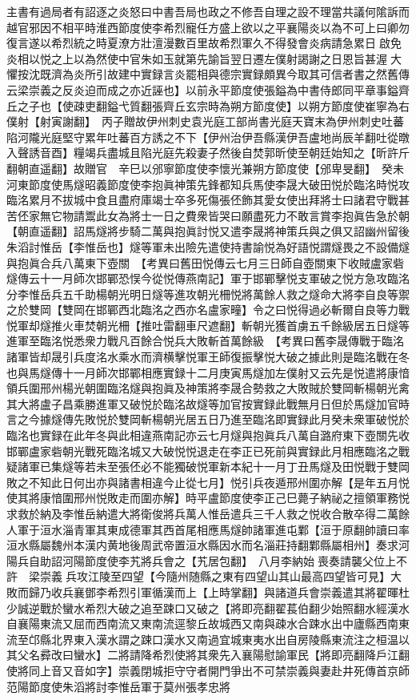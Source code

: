 主書有過局者有詔逐之炎怒曰中書吾局也政之不修吾自理之設不理當共議何隂訴而越官邪因不相平時淮西節度使李希烈寵任方盛上欲以之平襄陽炎以為不可上曰卿勿復言遂以希烈統之時夏潦方壯澶漫數百里故希烈軍久不得發會炎病請急累日啟免炎相以悦之上以為然使中官朱如玉就第先諭旨翌日遷左僕射謁謝之日恩旨甚渥大懼按沈既濟為炎所引故建中實録言炎罷相與德宗實録頗異今取其可信者書之然舊傳云梁崇義之反炎迫而成之亦近誣也】以前永平節度使張鎰為中書侍郎同平章事鎰齊丘之子也【使疎吏翻鎰弋質翻張齊丘玄宗時為朔方節度使】以朔方節度使崔寧為右僕射【射寅謝翻】　丙子贈故伊州刺史袁光庭工部尚書光庭天寶末為伊州刺史吐蕃陷河隴光庭堅守累年吐蕃百方誘之不下【伊州治伊吾縣漢伊吾盧地尚辰羊翻吐從暾入聲誘音酉】糧竭兵盡城且陷光庭先殺妻子然後自焚郭昕使至朝廷始知之【昕許斤翻朝直遥翻】故贈官　辛巳以邠寧節度使李懷光兼朔方節度使【邠卑旻翻】　癸未河東節度使馬燧昭義節度使李抱眞神策先鋒都知兵馬使李晟大破田悦於臨洺時悦攻臨洺累月不拔城中食且盡府庫竭士卒多死傷張伾飾其愛女使出拜將士曰諸君守戰甚苦伾家無它物請鬻此女為將士一日之費衆皆哭曰願盡死力不敢言賞李抱眞告急於朝【朝直遥翻】詔馬燧將步騎二萬與抱眞討悦又遣李晟將神策兵與之俱又詔幽州留後朱滔討惟岳【李惟岳也】燧等軍未出險先遣使持書諭悦為好語悦謂燧畏之不設備燧與抱眞合兵八萬東下壺關　【考異曰舊田悦傳云七月三日師自壺關東下收賊盧家砦燧傳云十一月師次邯鄲恐悮今從悦傳燕南記】軍于邯鄲擊悦支軍破之悦方急攻臨洺分李惟岳兵五千助楊朝光明日燧等進攻朝光柵悦將萬餘人救之燧命大將李自良等禦之於雙岡【雙岡在邯鄲西北臨洺之西亦名盧家疃】令之曰悦得過必斬爾自良等力戰悦軍却燧推火車焚朝光柵【推吐雷翻車尺遮翻】斬朝光獲首虜五千餘級居五日燧等進軍至臨洺悦悉衆力戰凡百餘合悦兵大敗斬首萬餘級　【考異曰舊李晟傳戰于臨洺諸軍皆却晟引兵度洺水乘水而濟横擊悦軍王師復振擊悦大破之據此則是臨洺戰在冬也與馬燧傳十一月師次邯鄲相應實録十二月庚寅馬燧加左僕射又云先是悦遣將康愔領兵圍邢州楊光朝圍臨洺燧與抱眞及神策將李晟合勢救之大敗賊於雙岡斬楊朝光禽其大將盧子昌乘勝進軍又破悦於臨洺故燧等加官按實録此戰無月日但於馬燧加官時言之今據燧傳先敗悦於雙岡斬楊朝光居五日乃進至臨洺即實録此月癸未衆軍破悦於臨洺也實録在此年冬與此相違燕南記亦云七月燧與抱眞兵八萬自潞府東下壺關先收邯鄲盧家砦朝光戰死臨洺城又大破悦悦退走在李正已死前與實録此月相應臨洺之戰疑諸軍已集燧等若未至張伾必不能獨破悦軍新本紀十一月丁丑馬燧及田悦戰于雙岡敗之不知此日何出亦與諸書相違今止從七月】悦引兵夜遁邢州圍亦解【是年五月悦使其將康愔圍邢州悦敗走而圍亦解】時平盧節度使李正己巳薨子納祕之擅領軍務悦求救於納及李惟岳納遣大將衛俊將兵萬人惟岳遣兵三千人救之悦收合散卒得二萬餘人軍于洹水淄青軍其東成德軍其西首尾相應馬燧帥諸軍進屯鄴【洹于原翻帥讀曰率洹水縣屬魏州本漢内黄地後周武帝置洹水縣因水而名淄莊持翻鄴縣屬相州】奏求河陽兵自助詔河陽節度使李艽將兵會之【艽居包翻】　八月李納始喪奏請襲父位上不許　梁崇義兵攻江陵至四望【今隨州随縣之東有四望山其山最高四望皆可見】大敗而歸乃收兵襄鄧李希烈引軍循漢而上【上時掌翻】與諸道兵會崇義遣其將翟暉杜少誠逆戰於蠻水希烈大破之追至踈口又破之【將即亮翻翟萇伯翻少始照翻水經漢水自襄陽東流又屈而西南流又東南流逕黎丘故城西又南與疎水合踈水出中廬縣西南東流至邙縣北界東入漢水謂之踈口漢水又南過宜城東夷水出自房陵縣東流注之桓温以其父名彛改曰蠻水】二將請降希烈使將其衆先入襄陽慰諭軍民【將即亮翻降戶江翻使將同上音又音如字】崇義閉城拒守守者開門爭出不可禁崇義與妻赴井死傳首京師范陽節度使朱滔將討李惟岳軍于莫州張孝忠將


